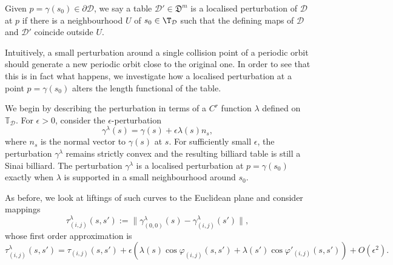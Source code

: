 \documentclass[reqno,11pt]{amsart}
\begin{document}
\begin{defi}
    Given \( p = \gamma(s_0) \in \partial\mathcal{D} \), we say a table \( \mathcal{D}' \in \mathfrak{D}^m \) is a localised perturbation of \( \mathcal{D} \) at \( p \) if there is a neighbourhood \( U \) of \( s_0 \in \T_\mathcal{D} \) such that the defining maps of \( \mathcal{D} \) and \( \mathcal{D}' \) coincide outside \( U \). 
\end{defi} 
Intuitively, a small perturbation around a single collision point of a periodic orbit should generate a new periodic orbit close to the original one. 
In order to see that this is in fact what happens, we investigate how a localised perturbation at a point \( p=\gamma(s_0) \) alters the length functional of the table.
\par We begin by describing the perturbation in terms of a $C^r$ function \( \lambda \) defined on \( \mathbb{T}_{\mathcal{D}} \).
For \( \epsilon >0 \), consider the \( \epsilon \)-perturbation
\begin{equation}\label{eq:defor_descrip}
    \gamma^\lambda(s) = \gamma(s) + \epsilon\lambda(s)n_s,
\end{equation}
where \( n_s \) is the normal vector to \( \gamma(s) \) at \( s \).
For sufficiently small \( \epsilon \), the perturbation \( \gamma^\lambda \) remains strictly convex and the resulting billiard table is still a Sinai billiard.
The perturbation \( \gamma^\lambda \) is a localised perturbation at \( p = \gamma(s_0) \) exactly when \( \lambda \) is supported in a small neighbourhood around \( s_0 \).
\par As before, we look at liftings of such curves to the Euclidean plane and consider mappings
\begin{equation*}
    \tau^\lambda_{(i,j)}(s,s') := \|\gamma^\lambda_{(0,0)}(s)-\gamma^\lambda_{(i,j)}(s')\|,
\end{equation*}
whose first order approximation is 
\begin{equation*}
    \tau^\lambda_{(i,j)}(s,s') = \tau_{(i,j)}(s,s') + \epsilon(\lambda(s)\cos\varphi_{(i,j)}(s,s') +\lambda(s')\cos\varphi'_{(i,j)}(s,s')) + O(\epsilon^{2}).
\end{equation*}
\end{document}
